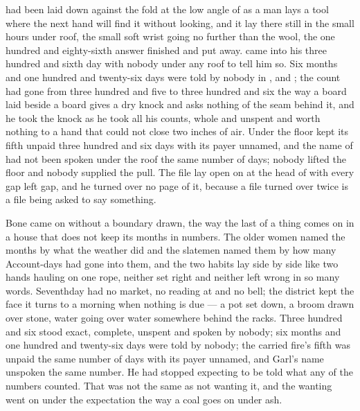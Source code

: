 
 had been laid down against the fold at the low angle of  as a man lays a tool where the next hand will find it without looking, and it lay there still in the small hours under  roof, the small soft wrist going no further than the wool, the one hundred and eighty-sixth answer finished and put away.  came into his three hundred and sixth day with nobody under any roof to tell him so. Six months and one hundred and twenty-six days were told by nobody in ,  and ; the count had gone from three hundred and five to three hundred and six the way a board laid beside a board gives a dry knock and asks nothing of the seam behind it, and he took the knock as he took all his counts, whole and unspent and worth nothing to a hand that could not close two inches of air. Under the floor  kept its fifth unpaid three hundred and six days with its payer unnamed, and the name of  had not been spoken under the roof the same number of days; nobody lifted the floor and nobody supplied the pull. The file lay open on  at the head of  with every gap left gap, and he turned over no page of it, because a file turned over twice is a file being asked to say something.

Bone came on without a boundary drawn, the way the last of a thing comes on in a house that does not keep its months in numbers. The older women named the months by what the weather did and the slatemen named them by how many Account-days had gone into them, and the two habits lay side by side like two hands hauling on one rope, neither set right and neither left wrong in so many words. Seventhday had no market, no reading at  and no bell; the district kept the face it turns to a morning when nothing is due --- a pot set down, a broom drawn over stone, water going over water somewhere behind the racks. Three hundred and six stood exact, complete, unspent and spoken by nobody; six months and one hundred and twenty-six days were told by nobody; the carried fire's fifth was unpaid the same number of days with its payer unnamed, and Garl's name unspoken the same number. He had stopped expecting to be told what any of the numbers counted. That was not the same as not wanting it, and the wanting went on under the expectation the way a coal goes on under ash.

